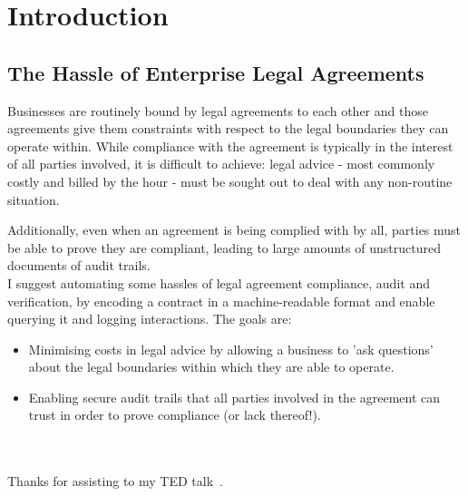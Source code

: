 \chapter{Introduction}\label{ch:introduction}

\section{The Hassle of Enterprise Legal Agreements}\label{sec:intro:legal-hassle}

Businesses are routinely bound by legal agreements to each other and those agreements give them constraints with respect to
the legal boundaries they can operate within.
While compliance with the agreement is typically in the interest of all parties involved, it is difficult
to achieve: legal advice - most commonly costly and billed by the hour - must be sought out to
deal with any non-routine situation.

Additionally, even when an agreement is being complied with by all, parties must be able to prove they are compliant,
leading to large amounts of unstructured documents of audit trails.\\

I suggest automating some hassles of legal agreement compliance, audit and verification, by encoding a contract
in a machine-readable format and enable querying it and logging interactions.
The goals are:
\begin{itemize}
    \item Minimising costs in legal advice by allowing a business to 'ask questions' about the legal boundaries within
    which they are able to operate.
    \item Enabling secure audit trails that all parties involved in the agreement can trust in order to prove
    compliance (or lack thereof!).
\end{itemize}

\\ \\
Thanks for assisting to my TED talk~\citeTODO.
